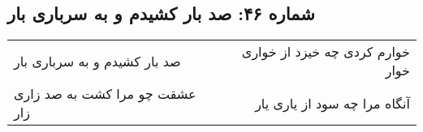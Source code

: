 \begin{center}
\section*{شماره ۴۶: صد بار کشیدم و به سرباری بار}
\label{sec:046}
\begin{longtable}{l p{0.5cm} r}
صد بار کشیدم و به سرباری بار
&&
خوارم کردی چه خیزد از خواری خوار
\\
عشقت چو مرا کشت به صد زاری زار
&&
آنگاه مرا چه سود از یاری یار
\\
\end{longtable}
\end{center}
